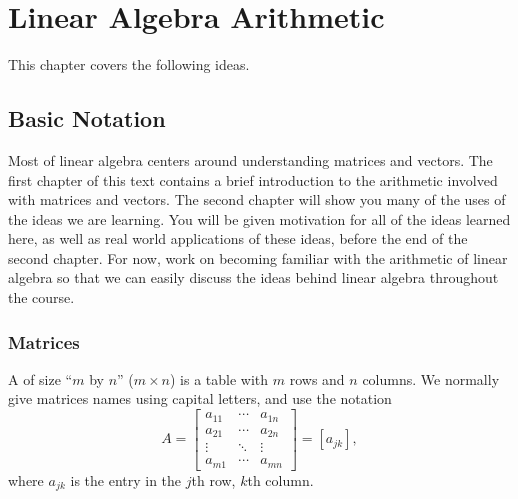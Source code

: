 
\chapter{Linear Algebra Arithmetic}

This chapter covers the following ideas. 




\section{Basic Notation}
Most of linear algebra centers around understanding matrices and vectors. The first chapter of this text contains a brief introduction to the arithmetic involved with matrices and vectors.  The second chapter will show you many of the uses of the ideas we are learning. You will be given motivation for all of the ideas learned here, as well as real world applications of these ideas, before the end of the second chapter.  For now, work on becoming familiar with the arithmetic of linear algebra so that we can easily discuss the ideas behind linear algebra throughout the course.


\subsection{Matrices}
A  of size ``{$m$} by {$n$}'' ($m\times n$) is a table
with {$m$} rows and {$n$} columns.  We normally give matrices names
using capital letters, and use the notation 
$$A = 
\begin{bmatrix}
a_{11}&\cdots&a_{1n}\\ 
a_{21}&\cdots&a_{2n}\\ 
\vdots&\ddots&\vdots\\ 
a_{m1}&\cdots&a_{mn} 
\end{bmatrix} 
= [a_{jk}],$$
where $a_{jk}$ is the entry in the $j$th row, $k$th column. 



